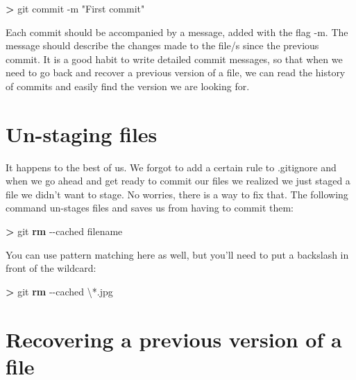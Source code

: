 \documentclass[
]{book}
\newenvironment{Shaded}{\begin{snugshade}}{\end{snugshade}}
\newcommand{\AttributeTok}[1]{\textcolor[rgb]{0.13,0.29,0.53}{#1}}
\newcommand{\DataTypeTok}[1]{\textcolor[rgb]{0.13,0.29,0.53}{#1}}
\newcommand{\ExtensionTok}[1]{#1}
\newcommand{\FunctionTok}[1]{\textcolor[rgb]{0.13,0.29,0.53}{\textbf{#1}}}
\newcommand{\NormalTok}[1]{#1}
\newcommand{\OperatorTok}[1]{\textcolor[rgb]{0.81,0.36,0.00}{\textbf{#1}}}
\newcommand{\StringTok}[1]{\textcolor[rgb]{0.31,0.60,0.02}{#1}}
\begin{document}
\begin{Shaded}
\begin{Highlighting}[]
\OperatorTok{\textgreater{}}\NormalTok{ git }\ExtensionTok{commit} \AttributeTok{{-}m} \StringTok{"First commit"}
\end{Highlighting}
\end{Shaded}

Each commit should be accompanied by a message, added with the flag -m. The message should describe the changes made to the file/s since the previous commit. It is a good habit to write detailed commit messages, so that when we need to go back and recover a previous version of a file, we can read the history of commits and easily find the version we are looking for.

\hypertarget{un-staging-files}{%
\section{Un-staging files}\label{un-staging-files}}

It happens to the best of us. We forgot to add a certain rule to .gitignore and when we go ahead and get ready to commit our files we realized we just staged a file we didn't want to stage. No worries, there is a way to fix that. The following command un-stages files and saves us from having to commit them:

\begin{Shaded}
\begin{Highlighting}[]
\OperatorTok{\textgreater{}}\NormalTok{ git }\FunctionTok{rm} \AttributeTok{{-}{-}cached}\NormalTok{ filename}
\end{Highlighting}
\end{Shaded}

You can use pattern matching here as well, but you'll need to put a backslash in front of the wildcard:

\begin{Shaded}
\begin{Highlighting}[]
\OperatorTok{\textgreater{}}\NormalTok{ git }\FunctionTok{rm} \AttributeTok{{-}{-}cached} \DataTypeTok{\textbackslash{}*}\NormalTok{.jpg}
\end{Highlighting}
\end{Shaded}

\hypertarget{recovering-a-previous-version-of-a-file}{%
\section{Recovering a previous version of a file}\label{recovering-a-previous-version-of-a-file}}
\end{document}
